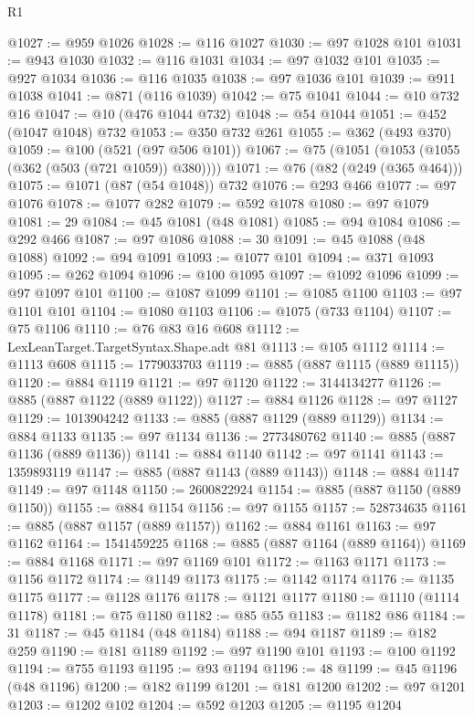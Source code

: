 \begin{lexlean}{R1}
\begin{coremodule}
@1027 := @959 @1026
@1028 := @116 @1027
@1030 := @97 @1028 @101
@1031 := @943 @1030
@1032 := @116 @1031
@1034 := @97 @1032 @101
@1035 := @927 @1034
@1036 := @116 @1035
@1038 := @97 @1036 @101
@1039 := @911 @1038
@1041 := @871 (@116 @1039)
@1042 := @75 @1041
@1044 := @10 @732 @16
@1047 := @10 (@476 @1044 @732)
@1048 := @54 @1044
@1051 := @452 (@1047 @1048) @732
@1053 := @350 @732 @261
@1055 := @362 (@493 @370)
@1059 := @100 (@521 (@97 @506 @101))
@1067 := @75 (@1051 (@1053 (@1055 (@362 (@503 (@721 @1059)) @380))))
@1071 := @76 (@82 (@249 (@365 @464)))
@1075 := @1071 (@87 (@54 @1048)) @732
@1076 := @293 @466
@1077 := @97 @1076
@1078 := @1077 @282
@1079 := @592 @1078
@1080 := @97 @1079
@1081 := 29
@1084 := @45 @1081 (@48 @1081)
@1085 := @94 @1084
@1086 := @292 @466
@1087 := @97 @1086
@1088 := 30
@1091 := @45 @1088 (@48 @1088)
@1092 := @94 @1091
@1093 := @1077 @101
@1094 := @371 @1093
@1095 := @262 @1094
@1096 := @100 @1095
@1097 := @1092 @1096
@1099 := @97 @1097 @101
@1100 := @1087 @1099
@1101 := @1085 @1100
@1103 := @97 @1101 @101
@1104 := @1080 @1103
@1106 := @1075 (@733 @1104)
@1107 := @75 @1106
@1110 := @76 @83 @16 @608
@1112 := LexLeanTarget.TargetSyntax.Shape.adt @81
@1113 := @105 @1112
@1114 := @1113 @608
@1115 := 1779033703
@1119 := @885 (@887 @1115 (@889 @1115))
@1120 := @884 @1119
@1121 := @97 @1120
@1122 := 3144134277
@1126 := @885 (@887 @1122 (@889 @1122))
@1127 := @884 @1126
@1128 := @97 @1127
@1129 := 1013904242
@1133 := @885 (@887 @1129 (@889 @1129))
@1134 := @884 @1133
@1135 := @97 @1134
@1136 := 2773480762
@1140 := @885 (@887 @1136 (@889 @1136))
@1141 := @884 @1140
@1142 := @97 @1141
@1143 := 1359893119
@1147 := @885 (@887 @1143 (@889 @1143))
@1148 := @884 @1147
@1149 := @97 @1148
@1150 := 2600822924
@1154 := @885 (@887 @1150 (@889 @1150))
@1155 := @884 @1154
@1156 := @97 @1155
@1157 := 528734635
@1161 := @885 (@887 @1157 (@889 @1157))
@1162 := @884 @1161
@1163 := @97 @1162
@1164 := 1541459225
@1168 := @885 (@887 @1164 (@889 @1164))
@1169 := @884 @1168
@1171 := @97 @1169 @101
@1172 := @1163 @1171
@1173 := @1156 @1172
@1174 := @1149 @1173
@1175 := @1142 @1174
@1176 := @1135 @1175
@1177 := @1128 @1176
@1178 := @1121 @1177
@1180 := @1110 (@1114 @1178)
@1181 := @75 @1180
@1182 := @85 @55
@1183 := @1182 @86
@1184 := 31
@1187 := @45 @1184 (@48 @1184)
@1188 := @94 @1187
@1189 := @182 @259
@1190 := @181 @1189
@1192 := @97 @1190 @101
@1193 := @100 @1192
@1194 := @755 @1193
@1195 := @93 @1194
@1196 := 48
@1199 := @45 @1196 (@48 @1196)
@1200 := @182 @1199
@1201 := @181 @1200
@1202 := @97 @1201
@1203 := @1202 @102
@1204 := @592 @1203
@1205 := @1195 @1204

\end{coremodule}
\end{lexlean}

